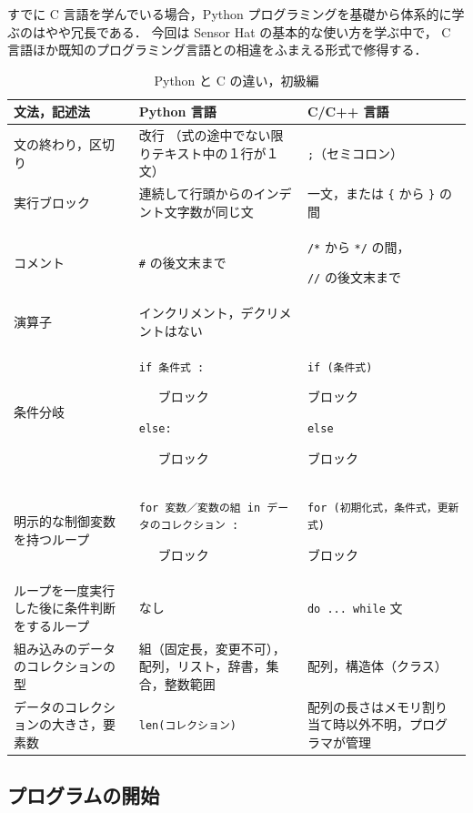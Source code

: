 \documentclass[11pt,a4,epsf]{article}
\begin{document}
すでに C 言語を学んでいる場合，Python プログラミングを基礎から体系的に学ぶのはやや冗長である．
今回は Sensor Hat の基本的な使い方を学ぶ中で， C 言語ほか既知のプログラミング言語との相違をふまえる形式で修得する．

\begin{table}[h]
\caption{Python と C の違い，初級編}
  \begin{tabular}{|p{1.5in}|p{2in}|p{2in}|}
\hline
文法，記述法 & Python 言語 & C/C++ 言語 \\
\hline
\hline
文の終わり，区切り & 改行 （式の途中でない限りテキスト中の１行が１文） & \verb+;+（セミコロン） \\
\hline
実行ブロック & 連続して行頭からのインデント文字数が同じ文 & 一文，または \verb+{+ から \verb+}+ の間\\
\hline
コメント & \verb+#+ の後文末まで & \verb+/*+ から \verb+*/+ の間，\par \verb+//+ の後文末まで \\
\hline
演算子 & インクリメント，デクリメントはない &  \\
\hline
条件分岐 & \verb+if 条件式 :+\par ~~~ブロック \par\verb+else:+ \par ~~~ブロック & \verb+if (条件式) +\par ブロック\par\verb+else+\par ブロック \\
\hline
明示的な制御変数を持つループ & \verb+for 変数／変数の組 in データのコレクション :+ \par ~~~ブロック& \verb+for (初期化式，条件式，更新式)+ \par ブロック \\
\hline
ループを一度実行した後に条件判断をするループ & なし & \verb+do ... while+ 文\\
\hline
組み込みのデータのコレクションの型 & 組（固定長，変更不可），配列，リスト，辞書，集合，整数範囲 & 配列，構造体（クラス）\\
\hline
データのコレクションの大きさ，要素数 & \verb+len(コレクション)+ & 配列の長さはメモリ割り当て時以外不明，プログラマが管理\\
\hline
  \end{tabular}
\end{table}

\subsection{プログラムの開始}
\end{document}
